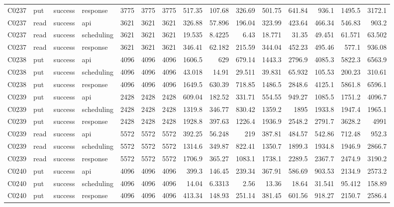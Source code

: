 \begin{landscape}
\begin{longtable}{llllrrrrrrrrrrr}
C0237 & put & success & response & 3775 & 3775 & 3775 & 517.35 & 107.68 & 326.69 & 501.75 & 641.84 & 936.1 & 1495.5 & 3172.1\\
C0237 & read & success & api & 3621 & 3621 & 3621 & 326.88 & 57.896 & 196.04 & 323.99 & 423.64 & 466.34 & 546.83 & 903.2\\
C0237 & read & success & scheduling & 3621 & 3621 & 3621 & 19.535 & 8.4225 & 6.43 & 18.771 & 31.35 & 49.451 & 61.571 & 63.502\\
C0237 & read & success & response & 3621 & 3621 & 3621 & 346.41 & 62.182 & 215.59 & 344.04 & 452.23 & 495.46 & 577.1 & 936.08\\
C0238 & put & success & api & 4096 & 4096 & 4096 & 1606.5 & 629 & 679.14 & 1443.3 & 2796.9 & 4085.3 & 5822.3 & 6563.9\\
C0238 & put & success & scheduling & 4096 & 4096 & 4096 & 43.018 & 14.91 & 29.511 & 39.831 & 65.932 & 105.53 & 200.23 & 310.61\\
C0238 & put & success & response & 4096 & 4096 & 4096 & 1649.5 & 630.39 & 718.85 & 1486.5 & 2848.6 & 4125.1 & 5861.8 & 6596.1\\
C0239 & put & success & api & 2428 & 2428 & 2428 & 609.04 & 182.52 & 331.71 & 554.55 & 949.27 & 1085.5 & 1751.2 & 4096.7\\
C0239 & put & success & scheduling & 2428 & 2428 & 2428 & 1319.8 & 346.77 & 830.42 & 1359.2 & 1895 & 1933.8 & 1947.4 & 1965.1\\
C0239 & put & success & response & 2428 & 2428 & 2428 & 1928.8 & 397.63 & 1226.4 & 1936.9 & 2548.2 & 2791.7 & 3628.2 & 4991\\
C0239 & read & success & api & 5572 & 5572 & 5572 & 392.25 & 56.248 & 219 & 387.81 & 484.57 & 542.86 & 712.48 & 952.3\\
C0239 & read & success & scheduling & 5572 & 5572 & 5572 & 1314.6 & 349.87 & 822.41 & 1350.7 & 1899.3 & 1934.8 & 1946.9 & 2866.7\\
C0239 & read & success & response & 5572 & 5572 & 5572 & 1706.9 & 365.27 & 1083.1 & 1738.1 & 2289.5 & 2367.7 & 2474.9 & 3190.2\\
C0240 & put & success & api & 4096 & 4096 & 4096 & 399.3 & 146.45 & 239.34 & 367.91 & 586.69 & 903.53 & 2134.9 & 2573.2\\
C0240 & put & success & scheduling & 4096 & 4096 & 4096 & 14.04 & 6.3313 & 2.56 & 13.36 & 18.64 & 31.541 & 95.412 & 158.89\\
C0240 & put & success & response & 4096 & 4096 & 4096 & 413.34 & 148.93 & 251.14 & 381.45 & 601.56 & 918.27 & 2150.7 & 2586.4\\

\end{longtable}
\end{landscape}
